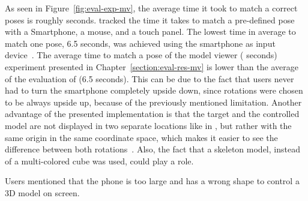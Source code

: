 As seen in Figure~\ref{fig:eval-exp-mv}, the average time it took to match a correct poses is roughly \evalExpMvAvgPoses{} seconds. \citeauthor{Katzakis.2010} tracked the time it takes to match a pre-defined pose with a Smartphone, a mouse, and a touch panel. The lowest time in average to match one pose, 6.5 seconds, was achieved using the smartphone as input device~\cite[140]{Katzakis.2010}. The average time to match a pose of the model viewer (\evalExpMvAvgPoses{} seconds) experiment presented in Chapter~\ref{section:eval-res-mv} is lower than the average of the evaluation of \citeauthor{Katzakis.2010} (6.5 seconds). This can be due to the fact that users never had to turn the smartphone completely upside down, since rotations were chosen to be always upside up, because of the previously mentioned limitation. Another advantage of the presented implementation is that the target and the controlled model are not displayed in two separate locations like in {}, but rather with the same origin in the same coordinate space, which makes it easier to see the difference between both rotations~\cite[140]{Katzakis.2010}. Also, the fact that a skeleton model, instead of a multi-colored cube was used, could play a role. 

Users mentioned that the phone is too large and has a wrong shape to control a \ac{3D} model on screen. 

